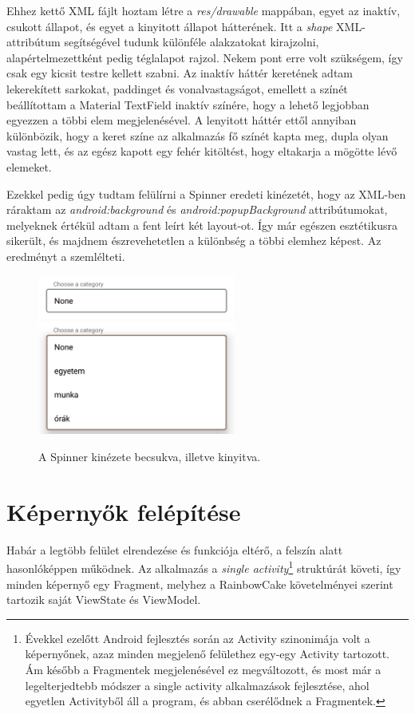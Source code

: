 Ehhez kettő XML fájlt hoztam létre a \emph{res/drawable} mappában, egyet az inaktív, csukott állapot, és egyet a kinyitott állapot hátterének. Itt a \emph{shape} XML-attribútum segítségével tudunk különféle alakzatokat kirajzolni, alapértelmezettként pedig téglalapot rajzol. Nekem pont erre volt szükségem, így csak egy kicsit testre kellett szabni. Az inaktív háttér keretének adtam lekerekített sarkokat, paddinget és vonalvastagságot, emellett a színét beállítottam a Material TextField inaktív színére, hogy a lehető legjobban egyezzen a többi elem megjelenésével. A lenyitott háttér ettől annyiban különbözik, hogy a keret színe az alkalmazás fő színét kapta meg, dupla olyan vastag lett, és az egész kapott egy fehér kitöltést, hogy eltakarja a mögötte lévő elemeket. 

Ezekkel pedig úgy tudtam felülírni a Spinner eredeti kinézetét, hogy az XML-ben ráraktam az \emph{android:background} és \emph{android:popupBackground} attribútumokat, melyeknek értékül adtam a fent leírt két layout-ot. Így már egészen esztétikusra sikerült, és majdnem észrevehetetlen a különbség a többi elemhez képest. Az eredményt a  szemlélteti.

\begin{figure}[!ht]
	\centering
	\includegraphics[width=65mm, keepaspectratio]{figures/custom_spinner_closed.png}
	\includegraphics[width=65mm, keepaspectratio]{figures/custom_spinner_open.png}
	\caption{A Spinner kinézete becsukva, illetve kinyitva.}
	\label{fig:CustomSpinner}
\end{figure}

\section{Képernyők felépítése}
Habár a legtöbb felület elrendezése és funkciója eltérő, a felszín alatt hasonlóképpen működnek. Az alkalmazás a \emph{single activity}\footnote{Évekkel ezelőtt Android fejlesztés során az Activity szinonimája volt a képernyőnek, azaz minden megjelenő felülethez egy-egy Activity tartozott. Ám később a Fragmentek megjelenésével ez megváltozott, és most már a legelterjedtebb módszer a single activity alkalmazások fejlesztése, ahol egyetlen Activityből áll a program, és abban cserélődnek a Fragmentek.} struktúrát követi, így minden képernyő egy Fragment, melyhez a RainbowCake követelményei szerint tartozik saját ViewState és ViewModel. 

